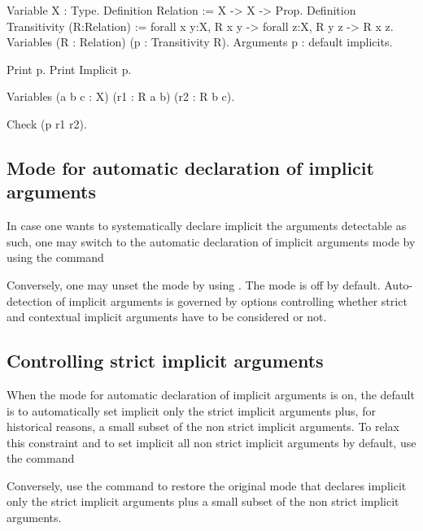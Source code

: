 \begin{coq_example*}
Variable X : Type.
Definition Relation := X -> X -> Prop.
Definition Transitivity (R:Relation) :=
  forall x y:X, R x y -> forall z:X, R y z -> R x z.
Variables (R : Relation) (p : Transitivity R).
Arguments p : default implicits.
\end{coq_example*}
\begin{coq_example}
Print p.
Print Implicit p.
\end{coq_example}
\begin{coq_example*}
Variables (a b c : X) (r1 : R a b) (r2 : R b c).
\end{coq_example*}
\begin{coq_example}
Check (p r1 r2).
\end{coq_example}

\subsection{Mode for automatic declaration of implicit arguments
\label{Auto-implicit}
}

In case one wants to systematically declare implicit the arguments
detectable as such, one may switch to the automatic declaration of
implicit arguments mode by using the command
\begin{quote}
{}
\end{quote}
Conversely, one may unset the mode by using {}.  The mode is off by default. Auto-detection of implicit
arguments is governed by options controlling whether strict and
contextual implicit arguments have to be considered or not.

\subsection{Controlling strict implicit arguments
\label{SetStrictImplicit}}

When the mode for automatic declaration of implicit arguments is on,
the default is to automatically set implicit only the strict implicit
arguments plus, for historical reasons, a small subset of the non
strict implicit arguments. To relax this constraint and to
set implicit all non strict implicit arguments by default, use the command
\begin{quote}
{}
\end{quote}
Conversely, use the command {} to
restore the original mode that declares implicit only the strict implicit arguments plus a small subset of the non strict implicit arguments.

